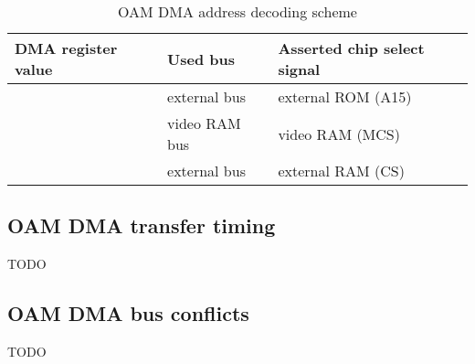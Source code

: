 \begin{table}[H]
  \caption{OAM DMA address decoding scheme}
  \rmfamily
  \begin{tabularx}{\textwidth}{|L|L|L|}
    \hline
    DMA register value & Used bus      & Asserted chip select signal \\
    \hline
      & external bus  & external ROM (A15)          \\
    \hline
      & video RAM bus & video RAM (MCS)             \\
    \hline
      & external bus  & external RAM (CS)           \\
    \hline
  \end{tabularx}
\end{table}

\subsection{OAM DMA transfer timing}

TODO

\subsection{OAM DMA bus conflicts}

TODO
